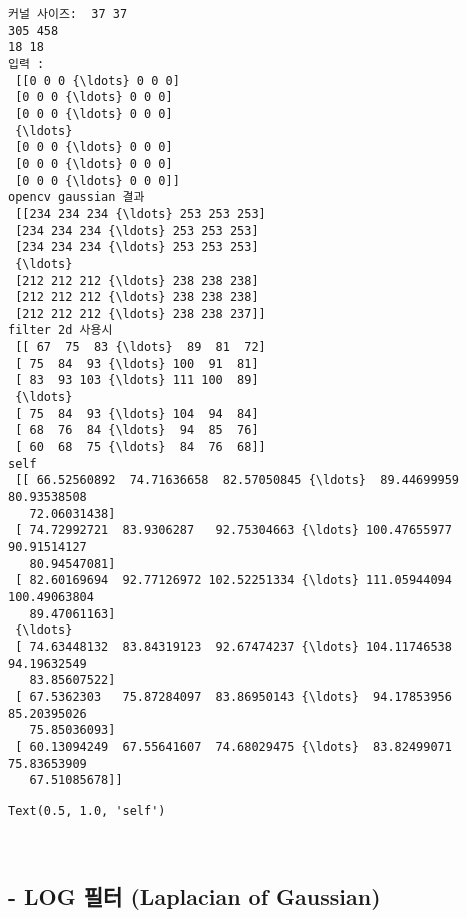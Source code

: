 \documentclass[11pt]{article}
\makeatletter
\newcommand{\boxspacing}{\kern\kvtcb@left@rule\kern\kvtcb@boxsep}
\newcommand{\prompt}[4]{
        {\ttfamily\llap{{\color{#2}[#3]:\hspace{3pt}#4}}\vspace{-\baselineskip}}
    }
\makeatother
\begin{document}
    \begin{Verbatim}[commandchars=\\\{\}]
커널 사이즈:  37 37
305 458
18 18
입력 :
 [[0 0 0 {\ldots} 0 0 0]
 [0 0 0 {\ldots} 0 0 0]
 [0 0 0 {\ldots} 0 0 0]
 {\ldots}
 [0 0 0 {\ldots} 0 0 0]
 [0 0 0 {\ldots} 0 0 0]
 [0 0 0 {\ldots} 0 0 0]]
opencv gaussian 결과
 [[234 234 234 {\ldots} 253 253 253]
 [234 234 234 {\ldots} 253 253 253]
 [234 234 234 {\ldots} 253 253 253]
 {\ldots}
 [212 212 212 {\ldots} 238 238 238]
 [212 212 212 {\ldots} 238 238 238]
 [212 212 212 {\ldots} 238 238 237]]
filter 2d 사용시
 [[ 67  75  83 {\ldots}  89  81  72]
 [ 75  84  93 {\ldots} 100  91  81]
 [ 83  93 103 {\ldots} 111 100  89]
 {\ldots}
 [ 75  84  93 {\ldots} 104  94  84]
 [ 68  76  84 {\ldots}  94  85  76]
 [ 60  68  75 {\ldots}  84  76  68]]
self
 [[ 66.52560892  74.71636658  82.57050845 {\ldots}  89.44699959  80.93538508
   72.06031438]
 [ 74.72992721  83.9306287   92.75304663 {\ldots} 100.47655977  90.91514127
   80.94547081]
 [ 82.60169694  92.77126972 102.52251334 {\ldots} 111.05944094 100.49063804
   89.47061163]
 {\ldots}
 [ 74.63448132  83.84319123  92.67474237 {\ldots} 104.11746538  94.19632549
   83.85607522]
 [ 67.5362303   75.87284097  83.86950143 {\ldots}  94.17853956  85.20395026
   75.85036093]
 [ 60.13094249  67.55641607  74.68029475 {\ldots}  83.82499071  75.83653909
   67.51085678]]
    \end{Verbatim}

            \begin{tcolorbox}[breakable, size=fbox, boxrule=.5pt, pad at break*=1mm, opacityfill=0]
\prompt{Out}{outcolor}{112}{\boxspacing}
\begin{Verbatim}[commandchars=\\\{\}]
Text(0.5, 1.0, 'self')
\end{Verbatim}
\end{tcolorbox}
        
    \begin{center}
    \end{center}
    { \hspace*{\fill} \\}
    
    \hypertarget{log-uxd544uxd130-laplacian-of-gaussian}{%
\subsection{- LOG 필터 (Laplacian of
Gaussian)}\label{log-uxd544uxd130-laplacian-of-gaussian}}
\end{document}
